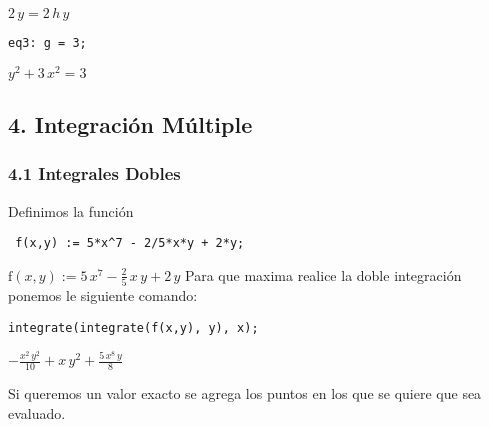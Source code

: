 \documentclass[12pt]{article}
\begin{document}

\begin{math}
2\,y=2\,h\,y
\end{math}

\noindent

\begin{verbatim}
eq3: g = 3;
\end{verbatim}


\begin{math}
{y}^{2}+3\,{x}^{2}=3
\end{math}





\subsection*{4. Integración Múltiple}

\subsubsection*{4.1 Integrales Dobles}
Definimos la función

\noindent

\begin{verbatim}
 f(x,y) := 5*x^7 - 2/5*x*y + 2*y;
\end{verbatim}


\begin{math}
\mathrm{f}\left( x,y\right) :=5\,{x}^{7}-\frac{2}{5}\,x\,y+2\,y
\end{math}
Para que maxima realice la doble integración ponemos le siguiente comando:


\noindent

\begin{verbatim}
integrate(integrate(f(x,y), y), x);
\end{verbatim}

\begin{math}
-\frac{{x}^{2}\,{y}^{2}}{10}+x\,{y}^{2}+\frac{5\,{x}^{8}\,y}{8}
\end{math}
 
 Si queremos un valor exacto se agrega los puntos en los que se quiere que sea evaluado.
 
\noindent
\end{document}
